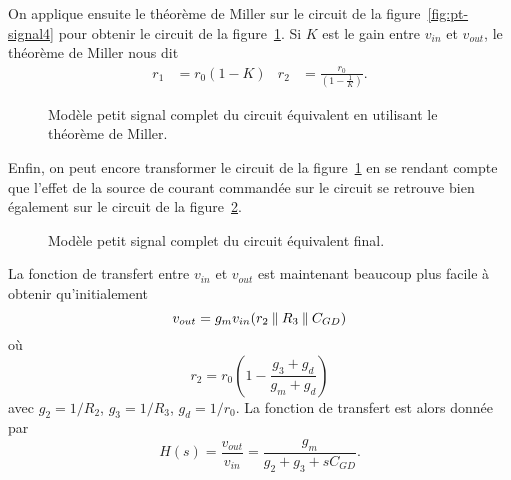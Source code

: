 \documentclass[frenchb,DIV=14]{scrartcl}
\begin{document}
On applique ensuite le théorème de Miller sur le circuit de la figure~\ref{fig:pt-signal4}
pour obtenir le circuit de la figure~\ref{fig:pt-signal5}.
Si $K$ est le gain entre $v_{in}$ et $v_{out}$, le théorème de Miller nous dit
\begin{align*}
	r_1 &= r_0(1-K) & r_2 &= \frac{r_0}{(1-\frac{1}{K})}.
\end{align*}

\begin{figure}[h]
	\centering
	\caption{Modèle petit signal complet du circuit équivalent en utilisant le
	théorème de Miller.}
	\label{fig:pt-signal5}
\end{figure}

Enfin, on peut encore transformer le circuit de la figure~\ref{fig:pt-signal5}
en se rendant compte que l'effet de la source de courant commandée sur le circuit
se retrouve bien également sur le circuit de la figure~\ref{fig:pt-signal6}.

\begin{figure}[h]
	\centering
	\caption{Modèle petit signal complet du circuit équivalent final.}
	\label{fig:pt-signal6}
\end{figure}

La fonction de transfert entre $v_{in}$ et $v_{out}$ est maintenant beaucoup
plus facile à obtenir qu'initialement
\[ v_{out} = g_m v_{in} (r_2 \mathbin{\|} R_3 \mathbin{\|} C_{GD}) \]
où
\[ r_2 = r_0\left(1-\frac{g_3+g_d}{g_m+g_d}\right) \]
avec $g_2 = 1/R_2$, $g_3 = 1/R_3$, $g_d = 1/r_0$.
La fonction de transfert est alors donnée par
\[ H(s) = \frac{v_{out}}{v_{in}} = \frac{g_m}{g_2 + g_3 + sC_{GD}}. \]
\end{document}

